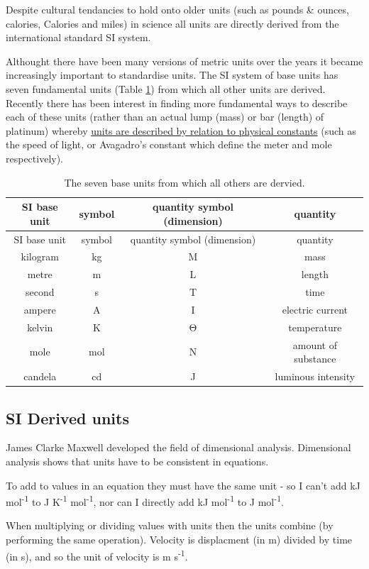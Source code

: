 \documentclass[
]{book}
\begin{document}
Despite cultural tendancies to hold onto older units (such as pounds \& ounces, calories, Calories and miles) in science all units are directly derived from the international standard SI system.

Althought there have been many versions of metric units over the years it became increasingly important to standardise units. The SI system of base units has seven fundamental units (Table \ref{tab:SIbase}) from which all other units are derived. Recently there has been interest in finding more fundamental ways to describe each of these units (rather than an actual lump (mass) or bar (length) of platinum) whereby \href{https://www.npl.co.uk/si-units/the-redefinition-of-the-si-units}{units are described by relation to physical constants} (such as the speed of light, or Avagadro's constant which define the meter and mole respectively).

\begin{longtable}[]{@{}cccc@{}}
\caption{\label{tab:SIbase} The seven base units from which all others are dervied.}\tabularnewline
\toprule
SI base unit & symbol & quantity symbol (dimension) & quantity\tabularnewline
\midrule
\endfirsthead
\toprule
SI base unit & symbol & quantity symbol (dimension) & quantity\tabularnewline
\midrule
\endhead
kilogram & kg & M & mass\tabularnewline
metre & m & L & length\tabularnewline
second & s & T & time\tabularnewline
ampere & A & I & electric current\tabularnewline
kelvin & K & Θ & temperature\tabularnewline
mole & mol & N & amount of substance\tabularnewline
candela & cd & J & luminous intensity\tabularnewline
\bottomrule
\end{longtable}

\hypertarget{si-derived-units}{%
\subsection{SI Derived units}\label{si-derived-units}}

James Clarke Maxwell developed the field of dimensional analysis. Dimensional analysis shows that units have to be consistent in equations.

To add to values in an equation they must have the same unit - so I can't add kJ mol\textsuperscript{-1} to J K\textsuperscript{-1} mol\textsuperscript{-1}, nor can I directly add kJ mol\textsuperscript{-1} to J mol\textsuperscript{-1}.

When multiplying or dividing values with units then the units combine (by performing the same operation). Velocity is displacment (in m) divided by time (in s), and so the unit of velocity is m s\textsuperscript{-1}.
\end{document}
